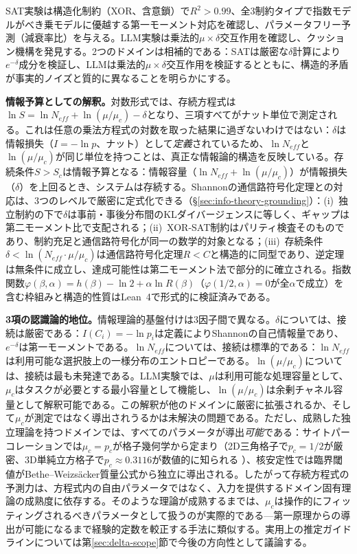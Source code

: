 \documentclass[11pt,a4paper]{article}
\begin{document}
SAT実験は構造化制約（XOR、含意鎖）で$R^2 > 0.99$、全3制約タイプで指数モデルがべき乗モデルに優越する第一モーメント対応を確認し、パラメータフリー予測（減衰率比）を与える。LLM実験は乗法的$\mu \times \delta$交互作用を確認し、クッション機構を発見する。2つのドメインは相補的である：SATは厳密な$\delta$計算により$e^{-\delta}$成分を検証し、LLMは乗法的$\mu \times \delta$交互作用を検証するとともに、構造的矛盾が事実的ノイズと質的に異なることを明らかにする。

\textbf{情報予算としての解釈。}対数形式では、存続方程式は$\ln S = \ln N_{eff} + \ln(\mu/\mu_c) - \delta$となり、三項すべてがナット単位で測定される。これは任意の乗法方程式の対数を取った結果に過ぎないわけではない：$\delta$は情報損失（$I = -\ln p$、ナット）として\emph{定義}されているため、$\ln N_{eff}$と$\ln(\mu/\mu_c)$が同じ単位を持つことは、真正な情報論的構造を反映している。存続条件$S > S_c$は情報予算となる：情報容量（$\ln N_{eff} + \ln(\mu/\mu_c)$）が情報損失（$\delta$）を上回るとき、システムは存続する。Shannonの通信路符号化定理\cite{shannon1948}との対応は、3つのレベルで厳密に定式化できる（\S\ref{sec:info-theory-grounding}）：(i)~独立制約の下で$\delta$は事前・事後分布間のKLダイバージェンスに等しく、ギャップは第二モーメント比で支配される；(ii)~XOR-SAT制約はパリティ検査そのものであり、制約充足と通信路符号化が同一の数学的対象となる；(iii)~存続条件$\delta < \ln(N_{eff} \cdot \mu/\mu_c)$は通信路符号化定理$R < C$と構造的に同型であり、逆定理は無条件に成立し、達成可能性は第二モーメント法で部分的に確立される。指数関数$\varphi(\beta, \alpha) = h(\beta) - \ln 2 + \alpha \ln R(\beta)$（$\varphi(1/2, \alpha) = 0$が全$\alpha$で成立）を含む枠組みと構造的性質はLean~4で形式的に検証済みである。

\textbf{3項の認識論的地位。}情報理論的基盤付けは3因子間で異なる。$\delta$については、接続は厳密である：$I(C_i) = -\ln p_i$は定義によりShannonの自己情報量であり、$e^{-\delta}$は第一モーメントである。$\ln N_{eff}$については、接続は標準的である：$\ln N_{eff}$は利用可能な選択肢上の一様分布のエントロピーである。$\ln(\mu/\mu_c)$については、接続は最も未発達である。LLM実験では、$\mu$は利用可能な処理容量として、$\mu_c$はタスクが必要とする最小容量として機能し、$\ln(\mu/\mu_c)$は余剰チャネル容量として解釈可能である。この解釈が他のドメインに厳密に拡張されるか、そして$\mu_c$が測定ではなく導出されうるかは未解決の問題である。ただし、成熟した独立理論を持つドメインでは、すべてのパラメータが導出\emph{可能}である：サイトパーコレーションでは$\mu_c = p_c$が格子幾何学から定まり（2D三角格子で$p_c = 1/2$が厳密、3D単純立方格子で$p_c \approx 0.3116$が数値的に知られる \cite{mertens2002exact}）、核安定性では臨界閾値がBethe--Weizs\"{a}cker質量公式から独立に導出される。したがって存続方程式の予測力は、方程式内の自由パラメータではなく、入力を提供するドメイン固有理論の成熟度に依存する。そのような理論が成熟するまでは、$\mu_c$は操作的にフィッティングされるべきパラメータとして扱うのが実際的である---第一原理からの導出が可能になるまで経験的定数を較正する手法に類似する。実用上の推定ガイドラインについては第\ref{sec:delta-scope}節で今後の方向性として議論する。
\end{document}
